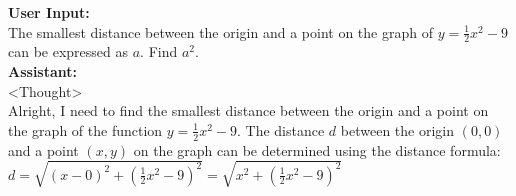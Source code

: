 \begin{abox} 
\textbf{User Input:}  \\
The smallest distance between the origin and a point on the graph of $y=\frac{1}{2}x^2-9$ can be expressed as $a$.  Find $a^2$. \\

\textbf{Assistant:}\\
<Thought>\\
Alright, I need to find the smallest distance between the origin and a point on the graph of the function $ y = \frac{1}{2}x^2 - 9 $. The distance $ d $ between the origin $ (0,0) $ and a point $ (x, y) $ on the graph can be determined using the distance formula:\\

$ d = \sqrt{(x - 0)^2 + \left( \frac{1}{2}x^2 - 9 \right)^2} = \sqrt{x^2 + \left( \frac{1}{2}x^2 - 9 \right)^2} $
\end{abox}
